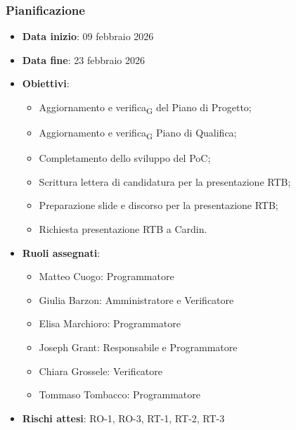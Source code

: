 \documentclass[11pt,a4paper]{article}
\newcommand{\gls}[1]{#1\textsubscript{G}}
\begin{document}
\subsubsection{Pianificazione}
\begin{itemize}
    \item \textbf{Data inizio}: 09 febbraio 2026
    \item \textbf{Data fine}: 23 febbraio 2026
    \item \textbf{Obiettivi}:
    \begin{itemize}
        \item Aggiornamento e \gls{verifica} del Piano di Progetto;
        \item Aggiornamento e \gls{verifica} Piano di Qualifica;
        \item Completamento dello sviluppo del PoC;
        \item Scrittura lettera di candidatura per la presentazione RTB;
        \item Preparazione slide e discorso per la presentazione RTB;
        \item Richiesta presentazione RTB a Cardin.
    \end{itemize}
    \item \textbf{Ruoli assegnati}:
    \begin{itemize}
        \item Matteo Cuogo: Programmatore
        \item Giulia Barzon: Amministratore e Verificatore
        \item Elisa Marchioro: Programmatore
        \item Joseph Grant: Responsabile e Programmatore
        \item Chiara Grossele: Verificatore
        \item Tommaso Tombacco: Programmatore
    \end{itemize}
    \item \textbf{Rischi attesi}: RO-1, RO-3, RT-1, RT-2, RT-3
\end{itemize}
\end{document}
